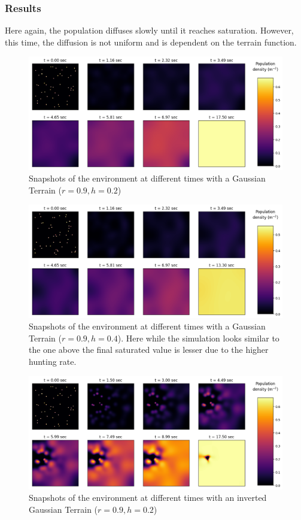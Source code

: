 \subsubsection{Results} \label{rough_section}

Here again, the population diffuses slowly until it reaches saturation. However, this time, the diffusion is not uniform and is dependent on the terrain function.

\begin{figure}[H]
    \centering
    \includegraphics[width=1\linewidth]{Figures/5/5c/terrain1_spread.png}
    \caption{Snapshots of the environment at different times with a Gaussian Terrain ($r=0.9,h=0.2$)}
\end{figure}

\begin{figure}[H]
    \centering
    \includegraphics[width=1\linewidth]{Figures/5/5c/rough_gauss_r4.png}
    \caption{Snapshots of the environment at different times with a Gaussian Terrain ($r=0.9,h=0.4$). Here while the simulation looks similar to the one above the final saturated value is lesser due to the higher hunting rate.}
\end{figure}

\begin{figure}[H]
    \centering
    \includegraphics[width=1\linewidth]{Figures/5/5c/terrain2_spread.png}
    \caption{Snapshots of the environment at different times with an inverted Gaussian Terrain ($r=0.9,h=0.2$)}
\end{figure}

